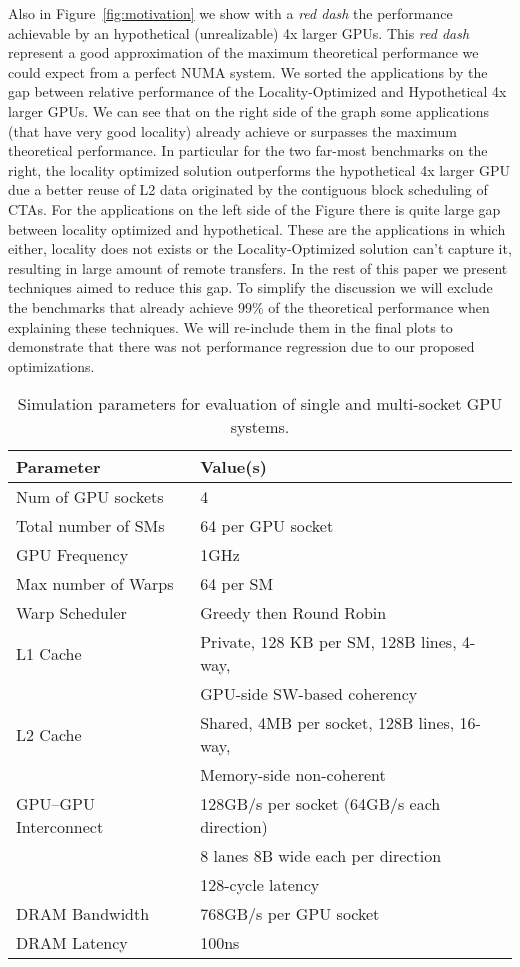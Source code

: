 Also in Figure~\ref{fig:motivation} we show with a \emph{red dash} the performance 
achievable by an hypothetical (unrealizable) 4x larger GPUs. This \emph{red dash} 
represent a good approximation of the maximum theoretical performance we 
could expect from a perfect NUMA system. We sorted the applications by the 
gap between relative performance of the Locality-Optimized and 
Hypothetical 4x larger GPUs. We can see that on the right side of the graph 
some applications (that have very good locality) already 
achieve or surpasses the maximum theoretical performance. In particular for the 
two far-most benchmarks on the right, the locality optimized solution outperforms 
the hypothetical 4x larger GPU due a better reuse of L2 data originated by 
the contiguous block scheduling of CTAs. For the applications on the left 
side of the Figure there is quite large gap between locality optimized and 
hypothetical. These are the applications in which either, locality does not 
exists or the Locality-Optimized solution can't capture it, 
resulting in large amount of remote transfers. In the rest of this paper we 
present techniques aimed to reduce this gap. To simplify the discussion we 
will exclude the benchmarks that already achieve 99\% of the theoretical 
performance when explaining these techniques. We will re-include them in the 
final plots to demonstrate that there was not performance regression due to 
our proposed optimizations.


\begin{table}[tp]
\begin{small}
\centering
\begin{tabular}{ll}
\toprule
\textbf{Parameter} & \textbf{Value(s)} \\
\toprule
Num of GPU sockets & 4 \\
\midrule
Total number of SMs & 64 per GPU socket \\
\midrule
GPU Frequency & 1GHz \\
\midrule
Max number of Warps & 64 per SM \\
\midrule
Warp Scheduler & Greedy then Round Robin \\
\midrule
L1 Cache & Private, 128 KB per SM, 128B lines, 4-way, \\ 
& GPU-side SW-based coherency \\
\midrule
L2 Cache & Shared, 4MB per socket, 128B lines, 16-way, \\ 
& Memory-side non-coherent\\
\midrule
GPU--GPU Interconnect & 128GB/s per socket (64GB/s each direction) \\
& 8 lanes 8B wide each per direction \\
&128-cycle latency \\
\midrule
DRAM Bandwidth & 768GB/s per GPU socket\\
\midrule
DRAM Latency & 100ns \\
\toprule
\end{tabular}
\caption{Simulation parameters for evaluation of single and multi-socket GPU 
systems.}
\label{tab:setup}
\end{small}
\end{table}

